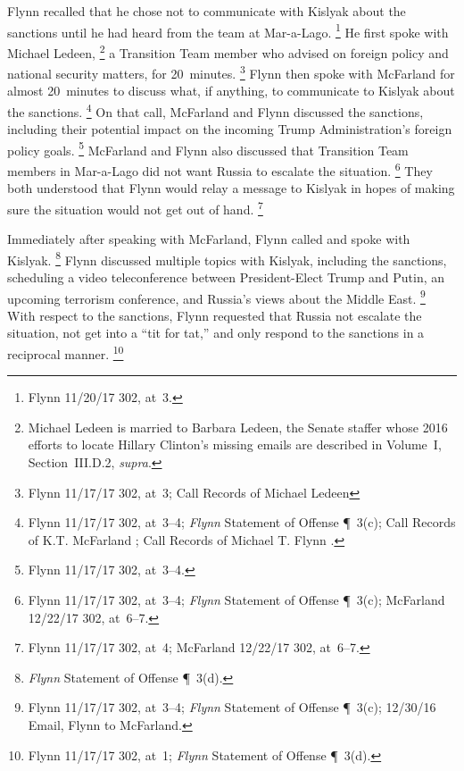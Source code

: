 Flynn recalled that he chose not to communicate with Kislyak about the sanctions until he had heard from the team at Mar-a-Lago.%
\footnote{Flynn 11/20/17 302, at~3.}
He first spoke with Michael Ledeen,%
\footnote{Michael Ledeen is married to Barbara Ledeen, the Senate staffer whose 2016 efforts to locate Hillary Clinton's missing emails are described in Volume~I, Section~III.D.2, \textit{supra}.}
a Transition Team member who advised on foreign policy and national security matters, for 20~minutes.%
\footnote{Flynn 11/17/17 302, at~3;
Call Records of Michael Ledeen }
Flynn then spoke with McFarland for almost 20~minutes to discuss what, if anything, to communicate to Kislyak about the sanctions.%
\footnote{Flynn 11/17/17 302, at~3--4;
\textit{Flynn} Statement of Offense \P~3(c);
Call Records of K.T. McFarland ;
Call Records of Michael T. Flynn .
}
On that call, McFarland and Flynn discussed the sanctions, including their potential impact on the incoming Trump Administration's foreign policy goals.%
\footnote{Flynn 11/17/17 302, at~3--4.}
McFarland and Flynn also discussed that Transition Team members in Mar-a-Lago did not want Russia to escalate the situation.%
\footnote{Flynn 11/17/17 302, at~3--4;
\textit{Flynn} Statement of Offense \P~3(c);
McFarland 12/22/17 302, at~6--7.}
They both understood that Flynn would relay a message to Kislyak in hopes of making sure the situation would not get out of hand.%
\footnote{Flynn 11/17/17 302, at~4;
McFarland 12/22/17 302, at~6--7.}

Immediately after speaking with McFarland, Flynn called and spoke with Kislyak.%
\footnote{\textit{Flynn} Statement of Offense \P~3(d).}
Flynn discussed multiple topics with Kislyak, including the sanctions, scheduling a video teleconference between President-Elect Trump and Putin, an upcoming terrorism conference, and Russia's views about the Middle East.%
\footnote{Flynn 11/17/17 302, at~3--4;
\textit{Flynn} Statement of Offense \P~3(c);
12/30/16 Email, Flynn to McFarland.}
With respect to the sanctions, Flynn requested that Russia not escalate the situation, not get into a ``tit for tat,'' and only respond to the sanctions in a reciprocal manner.%
\footnote{Flynn 11/17/17 302, at~1;
\textit{Flynn} Statement of Offense \P~3(d).}

